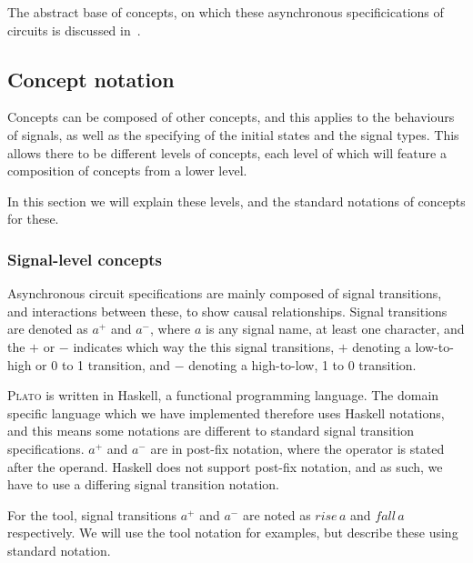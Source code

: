 \documentclass[british,conference,compsoc]{IEEEtran}
\newcommand{\noun}[1]{\textsc{#1}}
\begin{document}
\vspace{-3mm}

The abstract base of concepts, on which these asynchronous specificications of 
circuits is discussed in~\cite{2015_Beaumont_MEMOCODE}.

\vspace{-3mm}

\subsection{Concept notation \label{sub:concept-notation}}

\vspace{-3mm}

Concepts can be composed of other concepts, and this applies to the behaviours 
of signals, as well as the specifying of the initial states and the signal 
types. This allows there to be different levels of concepts, each level of 
which will feature a composition of concepts from a lower level. 

In this section we will explain these levels, and the standard notations of 
concepts for these. 

\vspace{-2mm}

\subsubsection{\label{signal-level}Signal-level concepts}Asynchronous circuit 
specifications are mainly composed of signal transitions, and interactions 
between these, to show causal relationships. Signal transitions are denoted as 
$a^{+}$ and $a^{-}$, where $a$ is any signal name, at least one character, and 
the $+$ or $-$ indicates which way the this signal transitions, $+$ denoting a 
low-to-high or 0 to 1 transition, and $-$ denoting a high-to-low, 1 to 0 
transition. 

\noun{Plato} is written in Haskell, a functional programming language. The 
domain specific language which we have implemented therefore uses Haskell 
notations, and this means some notations are different to standard signal 
transition specifications. $a^{+}$ and $a^{-}$ are in post-fix notation, where 
the operator is stated after the operand. Haskell does not support post-fix 
notation, and as such, we have to use a differing signal transition notation. 

For the tool, signal transitions $a^{+}$ and $a^{-}$ are noted as $rise\,a$ and 
$fall\,a$ respectively. We will use the tool notation for examples, but 
describe these using standard notation.
\end{document}
